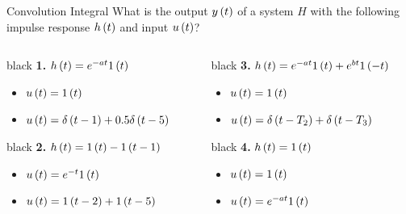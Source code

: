 \documentclass[aspectratio=169]{beamer}
\def\lp{\ensuremath\left(}
\def\rp{\ensuremath\right)}
\newcommand{\demoexc}[3]{\onslide<#1->\begin{color}{#2} #3 \end{color}}
\begin{document}
\begin{frame}{Convolution Integral}
What is the output $y\lp t\rp$ of a system $H$ with the following impulse response $h\lp t\rp$ and input $u\lp t\rp$?
\vspace{0.3cm}
\begin{columns}
\begin{column}{0.45\textwidth}
\demoexc{1}{black}{\textbf{1. }$h\lp t\rp = e^{-at}1\lp t\rp$
\begin{itemize}
    \item $u\lp t\rp = 1\lp t\rp$
    \item $u\lp t\rp = \delta\lp t - 1\rp + 0.5 \delta\lp t - 5\rp$
\end{itemize}
}
\vspace{0.3cm}
\demoexc{2}{black}{\textbf{2. }$h\lp t\rp = 1\lp t\rp - 1\lp t - 1\rp$
\begin{itemize}
    \item $u\lp t\rp = e^{-t}1\lp t\rp$
    \item $u\lp t\rp = 1\lp t - 2\rp + 1\lp t - 5\rp$
\end{itemize}
}
\end{column}

\begin{column}{0.5\textwidth}
\demoexc{3}{black}{\textbf{3. }$h\lp t\rp = e^{-at}1\lp t\rp + e^{bt}1\lp -t\rp$
\begin{itemize}
    \item $u\lp t\rp = 1\lp t\rp$
    \item $u\lp t\rp = \delta\lp t - T_2\rp + \delta\lp t - T_3\rp$
\end{itemize}
}
\vspace{0.3cm}
\demoexc{4}{black}{\textbf{4. }$h\lp t\rp = 1\lp t\rp$
\begin{itemize}
    \item $u\lp t\rp = 1\lp t\rp$
    \item $u\lp t\rp = e^{-at}1\lp t\rp$
\end{itemize}
}
\end{column}
\end{columns}
\end{frame}
\end{document}
